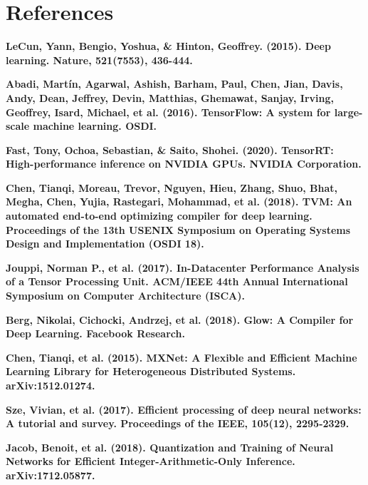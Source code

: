 \documentclass[sigconf]{acmart}
\begin{document}
\section{References}

\textbf{LeCun, Yann, Bengio, Yoshua, \& Hinton, Geoffrey. (2015). Deep learning. Nature, 521(7553), 436-444.} \vspace{3mm}

\textbf{Abadi, Martín, Agarwal, Ashish, Barham, Paul, Chen, Jian, Davis, Andy, Dean, Jeffrey, Devin, Matthias, Ghemawat, Sanjay, Irving, Geoffrey, Isard, Michael, et al. (2016). TensorFlow: A system for large-scale machine learning. OSDI.} \vspace{3mm}

\textbf{Fast, Tony, Ochoa, Sebastian, \& Saito, Shohei. (2020). TensorRT: High-performance inference on NVIDIA GPUs. NVIDIA Corporation.} \vspace{3mm}

\textbf{Chen, Tianqi, Moreau, Trevor, Nguyen, Hieu, Zhang, Shuo, Bhat, Megha, Chen, Yujia, Rastegari, Mohammad, et al. (2018). TVM: An automated end-to-end optimizing compiler for deep learning. Proceedings of the 13th USENIX Symposium on Operating Systems Design and Implementation (OSDI 18).} \vspace{3mm}

\textbf{Jouppi, Norman P., et al. (2017). In-Datacenter Performance Analysis of a Tensor Processing Unit. ACM/IEEE 44th Annual International Symposium on Computer Architecture (ISCA).}\vspace{3mm}

\textbf{Berg, Nikolai, Cichocki, Andrzej, et al. (2018). Glow: A Compiler for Deep Learning. Facebook Research.} \vspace{3mm}

\textbf{Chen, Tianqi, et al. (2015). MXNet: A Flexible and Efficient Machine Learning Library for Heterogeneous Distributed Systems. arXiv:1512.01274.}\vspace{3mm}

\textbf{Sze, Vivian, et al. (2017). Efficient processing of deep neural networks: A tutorial and survey. Proceedings of the IEEE, 105(12), 2295-2329.}\vspace{3mm}

\textbf{Jacob, Benoit, et al. (2018). Quantization and Training of Neural Networks for Efficient Integer-Arithmetic-Only Inference. arXiv:1712.05877.} \vspace{3mm}
\end{document}
